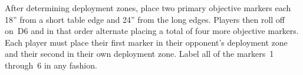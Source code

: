 

\begin{tablesetup}

\vanguardstrike

\bigskip%
After determining deployment zones, place two primary objective
markers each 18'' from a short table edge and 24'' from the long
edges.  Players then roll off on~D6 and in that order alternate
placing a total of four more objective markers.  Each player must
place their first marker in their opponent's deployment zone and their
second in their own deployment zone.  Label all of the markers~1
through~6 in any fashion.
\end{tablesetup}


\begin{missionrules}

\nightfighting

\standingorders

\end{missionrules}


\begin{scoring}
  
\begin{primaries}
\maelstromscoring
\end{primaries}

\pagebreak

\begin{secondaries}
  \holdthefield

  \breachpoints

  \breaktheirback

  \seekanddestroy
\end{secondaries}

\end{scoring}
